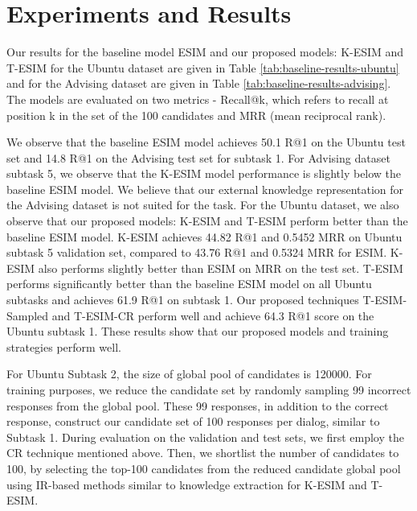 \documentclass[letterpaper]{article} %
\begin{document}

\section{Experiments and Results}
\label{Experiments and Results}
Our results for the baseline model ESIM and our proposed models: K-ESIM and T-ESIM for the Ubuntu dataset are given in Table \ref{tab:baseline-results-ubuntu} and for the Advising dataset are given in Table \ref{tab:baseline-results-advising}. The models are evaluated on two metrics - Recall@k, which refers to recall at position k in the set of the 100 candidates and MRR (mean reciprocal rank).

We observe that the baseline ESIM model achieves 50.1 R@1 on the Ubuntu test set and 14.8 R@1 on the Advising test set for subtask 1. For Advising dataset subtask 5, we observe that the K-ESIM model performance is slightly below the baseline ESIM model. We believe that our external knowledge representation for the Advising dataset is not suited for the task. For the Ubuntu dataset, we also observe that our proposed models: K-ESIM and T-ESIM perform better than the baseline ESIM model. K-ESIM achieves 44.82 R@1 and 0.5452 MRR on Ubuntu subtask 5 validation set, compared to 43.76 R@1 and 0.5324 MRR for ESIM. K-ESIM also performs slightly better than ESIM on MRR on the test set. T-ESIM performs significantly better than the baseline ESIM model on all Ubuntu subtasks and achieves 61.9 R@1 on subtask 1. Our proposed techniques T-ESIM-Sampled and T-ESIM-CR perform well and achieve 64.3 R@1 score on the Ubuntu subtask 1. These results show that our proposed models and training strategies perform well.

For Ubuntu Subtask 2, the size of global pool of candidates is 120000. For training purposes, we reduce the candidate set by randomly sampling 99 incorrect responses from the global pool. These 99 responses, in addition to the correct response, construct our candidate set of 100 responses per dialog, similar to Subtask 1. During evaluation on the validation and test sets, we first employ the CR technique mentioned above. Then, we shortlist the number of candidates to 100, by selecting the top-100 candidates from the reduced candidate global pool using IR-based methods similar to knowledge extraction for K-ESIM and T-ESIM.
\end{document}
